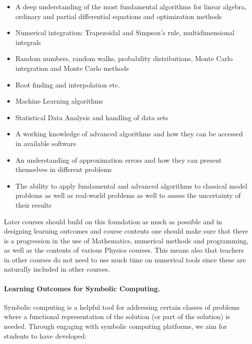 \documentclass[graybox,envcountchap,sectrefs]{svmult}
\begin{document}
\begin{itemize}
\item A deep understanding of the most fundamental algorithms for linear algebra, ordinary and partial differential equations and optimization methods

\item Numerical integration: Trapezoidal and Simpson's rule, multidimensional integrals

\item Random numbers, random walks, probability distributions, Monte Carlo integration and Monte Carlo methods

\item Root finding and interpolation etc.

\item Machine Learning algorithms 

\item Statistical Data Analysis and handling of data sets

\item A working knowledge of advanced algorithms and how they can be accessed in available software

\item An understanding of approximation errors and how they can present themselves in different problems

\item The ability to apply fundamental and advanced algorithms to classical model problems as well as real-world problems as well to assess the uncertainty of their results
\end{itemize}

\noindent
Later courses should build on this foundation as much as possible and in designing learning outcomes and course contents one should make sure
that there is a  progression in the use of Mathematics, numerical methods and programming, as well as the contents of various Physics courses.
This means also that teachers in other courses do not need to use much time on numerical tools since these are naturally included in other courses.



\paragraph{Learning Outcomes for Symbolic Computing.}
Symbolic computing is a helpful tool for addressing certain classes of problems where a functional representation of the solution (or part of the solution) is needed. Through engaging with symbolic computing platforms, we aim for students to have developed:
\end{document}
